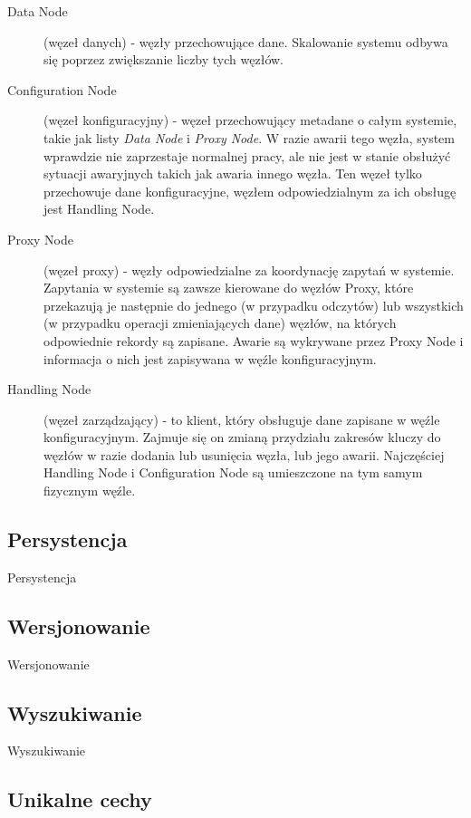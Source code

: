 \begin{description}
 \item[Data Node] (węzeł danych) - węzły przechowujące dane.
 Skalowanie systemu odbywa się poprzez zwiększanie liczby tych węzłów.

 \item[Configuration Node] (węzeł konfiguracyjny) - węzeł przechowujący metadane o całym systemie, takie jak listy \emph{Data Node} i \emph{Proxy Node}.
 W razie awarii tego węzła, system wprawdzie nie zaprzestaje normalnej pracy, ale nie jest w stanie obsłużyć sytuacji awaryjnych takich jak awaria innego węzła.
 Ten węzeł tylko przechowuje dane konfiguracyjne, węzłem odpowiedzialnym za ich obsługę jest Handling Node.

 \item[Proxy Node] (węzeł proxy) - węzły odpowiedzialne za koordynację zapytań w systemie.
 Zapytania w systemie są zawsze kierowane do węzłów Proxy, które przekazują je następnie do jednego (w przypadku odczytów) lub wszystkich (w przypadku operacji zmieniających dane) węzłów, na których odpowiednie rekordy są zapisane.
 Awarie są wykrywane przez Proxy Node i informacja o nich jest zapisywana w węźle konfiguracyjnym.

 \item[Handling Node] (węzeł zarządzający) - to klient, który obsługuje dane zapisane w węźle konfiguracyjnym.
 Zajmuje się on zmianą przydziału zakresów kluczy do węzłów w razie dodania lub usunięcia węzła, lub jego awarii.
 Najczęściej Handling Node i Configuration Node są umieszczone na tym samym fizycznym węźle.
\end{description}

\subsection*{Persystencja}

Persystencja

\subsection*{Wersjonowanie}

Wersjonowanie

\subsection*{Wyszukiwanie}

Wyszukiwanie

\subsection*{Unikalne cechy}

